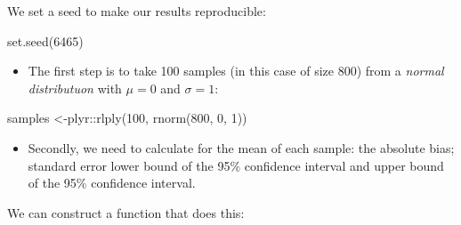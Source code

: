 \documentclass[
]{book}
\newenvironment{Shaded}{\begin{snugshade}}{\end{snugshade}}
\newcommand{\DecValTok}[1]{\textcolor[rgb]{0.00,0.00,0.81}{#1}}
\newcommand{\FunctionTok}[1]{\textcolor[rgb]{0.00,0.00,0.00}{#1}}
\newcommand{\NormalTok}[1]{#1}
\newcommand{\OtherTok}[1]{\textcolor[rgb]{0.56,0.35,0.01}{#1}}
\newcommand{\SpecialCharTok}[1]{\textcolor[rgb]{0.00,0.00,0.00}{#1}}
\providecommand{\tightlist}{%
  \setlength{\itemsep}{0pt}\setlength{\parskip}{0pt}}
\begin{document}
We set a seed to make our results reproducible:

\begin{Shaded}
\begin{Highlighting}[]
\FunctionTok{set.seed}\NormalTok{(}\DecValTok{6465}\NormalTok{)}
\end{Highlighting}
\end{Shaded}

\begin{itemize}
\tightlist
\item
  The first step is to take 100 samples (in this case of size 800) from a \emph{normal distributuon} with \(\mu = 0\) and \(\sigma = 1\):
\end{itemize}

\begin{Shaded}
\begin{Highlighting}[]
\NormalTok{samples }\OtherTok{\textless{}{-}}\NormalTok{plyr}\SpecialCharTok{::}\FunctionTok{rlply}\NormalTok{(}\DecValTok{100}\NormalTok{, }\FunctionTok{rnorm}\NormalTok{(}\DecValTok{800}\NormalTok{, }\DecValTok{0}\NormalTok{, }\DecValTok{1}\NormalTok{))}
\end{Highlighting}
\end{Shaded}

\begin{itemize}
\tightlist
\item
  Secondly, we need to calculate for the mean of each sample: the absolute bias; standard error lower bound of the 95\% confidence interval and upper bound of the 95\% confidence interval.
\end{itemize}

We can construct a function that does this:
\end{document}
